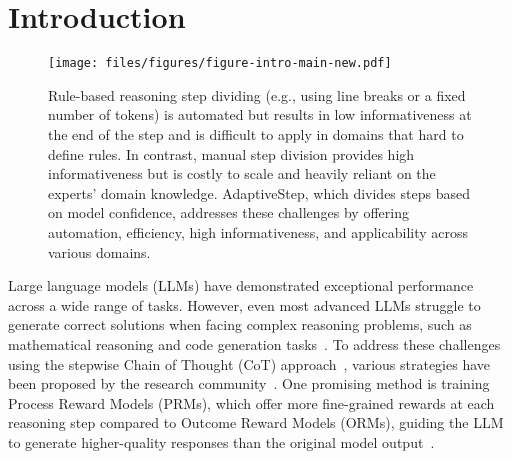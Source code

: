 \vspace{-0.4cm}

\section{Introduction}


\begin{figure}[ht]
    \centering
    \texttt{[image: files/figures/figure-intro-main-new.pdf]}    \caption{Rule-based reasoning step dividing (e.g., using line breaks or a fixed number of tokens) is automated but results in low informativeness at the end of the step and is difficult to apply in domains that hard to define rules. In contrast, manual step division provides high informativeness but is costly to scale and heavily reliant on the experts' domain knowledge. AdaptiveStep, which divides steps based on model confidence, addresses these challenges by offering automation, efficiency, high informativeness, and applicability across various domains.}
    \label{fig:example}
    \vspace{-0.5cm}
\end{figure}



Large language models (LLMs) have demonstrated exceptional performance across a wide range of tasks. However, even most advanced LLMs struggle to generate correct solutions when facing complex reasoning problems, such as mathematical reasoning and code generation tasks~\cite{huang2024largelanguagemodelsselfcorrect, tyen2024llmsreasoningerrorscorrect, mirzadeh2024gsmsymbolicunderstandinglimitationsmathematical, shen2024policy}. To address these challenges using the stepwise Chain of Thought (CoT) approach~\cite{wei2023chainofthoughtpromptingelicitsreasoning}, various strategies have been proposed by the research community~\cite{qin2024o1replicationjourneystrategic, deepseekai2025deepseekr1incentivizingreasoningcapability, kimiteam2025kimik15scalingreinforcement}. One promising method is training Process Reward Models (PRMs), which offer more fine-grained rewards at each reasoning step compared to Outcome Reward Models (ORMs), guiding the LLM to generate higher-quality responses than the original model output~\cite{shao2024deepseekmathpushinglimitsmathematical, sessa2024bondaligningllmsbestofn, gao2024llmcriticshelpcatch}.




